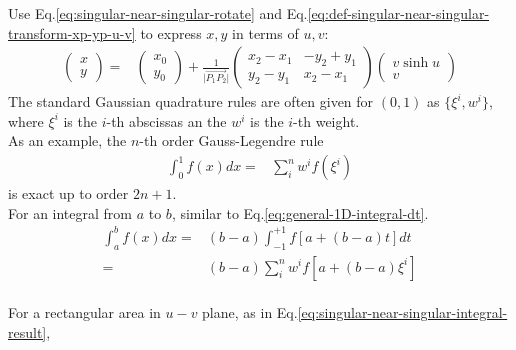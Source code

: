 \documentclass [10pt,letterpaper]{article}
\begin{document}
Use Eq.\eqref{eq:singular-near-singular-rotate} 
and Eq.\eqref{eq:def-singular-near-singular-transform-xp-yp-u-v} 
to express $x,y$ in terms of $u,v$:
\begin{equation} \label{eq:singular-near-singular-x-y-u-v}
	\begin{split} 
		\begin{pmatrix}
			x					\\
			y
		\end{pmatrix}
		=&
		\begin{pmatrix}
			x_0					\\
			y_0
		\end{pmatrix}
		+
		\frac{1}{\lvert \overrightarrow{P_1 P_2} \rvert}
		\begin{pmatrix} 
			x_2-x_1 	& 	-y_2+y_1	\\
			y_2-y_1 	& 	x_2-x_1		
		\end{pmatrix}
		\begin{pmatrix}
			v \sinh{u}				\\
			v
		\end{pmatrix}
	\end{split}
\end{equation}
The standard Gaussian quadrature rules are often given for $(0,1)$ as $\{\xi^i,w^i\}$,
where $\xi^i$ is the $i$-th abscissas an the $w^i$ is the $i$-th weight.
\\
As an example, the $n$-th order Gauss-Legendre rule 
\begin{equation} \label{eq:singular-near-singular-gauss-legendre-rule-example}
	\begin{split} 
		\int \nolimits_{0}^{1}
		f(x)
		dx
		=&
		\sum \limits_{i}^{n}
		w^i
		f(\xi^i)
	\end{split}
\end{equation}
is exact up to order $2n+1$.
\\
For an integral from $a$ to $b$, similar to Eq.\eqref{eq:general-1D-integral-dt}.
\begin{equation} \label{eq:singular-near-singular-general-1D-quadrature}
	\begin{split} 
		\int \nolimits_{a}^{b}
		f(x)
		dx
		=&
			(b-a)
			\int \nolimits_{-1}^{+1} 
			f[a+(b-a)t]
			dt
		\\
		=&
			(b-a)
			\sum \limits_{i}^{n}
			w^i
			f[a+(b-a)\xi^i]
	\end{split}
\end{equation}
\\
For a rectangular area in $u-v$ plane, 
as in Eq.\eqref{eq:singular-near-singular-integral-result},
\end{document}
